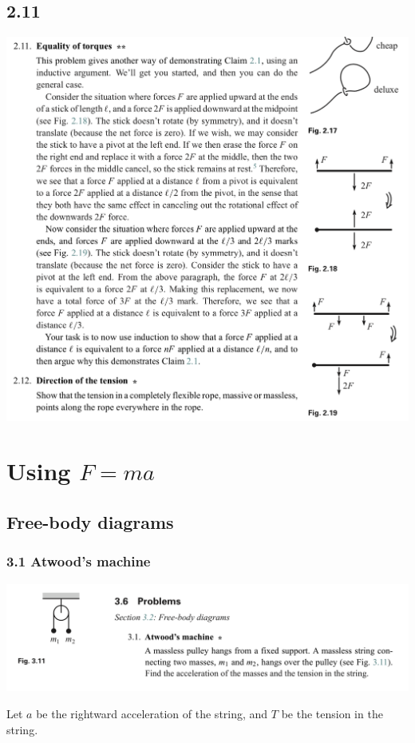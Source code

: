 \newpage
\subsection*{2.11}
\begin{mdframed}
  \includegraphics[width=400pt]{img/physics--classical-mechanics--morin--2-11.png}
\end{mdframed}
\newpage
\section{Using $F = ma$}
\subsection*{Free-body diagrams}

\subsubsection*{3.1 Atwood's machine}
\begin{mdframed}
  \includegraphics[width=400pt]{img/physics--classical-mechanics--morin--3-1.png}
\end{mdframed}
Let $a$ be the rightward acceleration of the string, and $T$ be the tension in the string.

